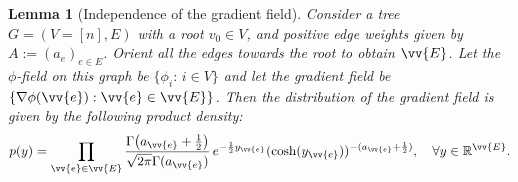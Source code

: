 \documentclass[a4paper, 11pt]{article}
\newtheorem{lem}[thm]{Lemma}
\begin{document}
\vspace{.3em}
\begin{lem}[Independence of the gradient field]
\label{lem:grad_indep}
Consider a tree $G=(V=[n], E)$ with a root $v_0\in V$, and positive edge weights given by $A:=(a_e)_{e\in E}$. Orient all the edges towards the root to obtain $\vv{E}$. Let the $\phi$-field on this graph be $\{\phi_i:\,i\in V\}$ and let the gradient field be $\{ \nabla \phi(\vv{e}) : \vv{e} \in \vv{E} \}$. Then the distribution of the gradient field is given by the following product density:
\[p(y)
    = \prod_{\vv{e}\in \vv{E}}\frac{\Gamma\big(a_{\vv{e}}+\frac{1}{2}\big)}{\sqrt{2\pi}\Gamma(a_{\vv{e}})} \,e^{-\frac{1}{2}y_{\vv{e}}} (\cosh(y_{\vv{e}}))^{-(a_{\vv{e}}+\frac{1}{2})},\quad\forall y\in\mathbb{R}^{\vv{E}}.\]
\end{lem}
\end{document}
